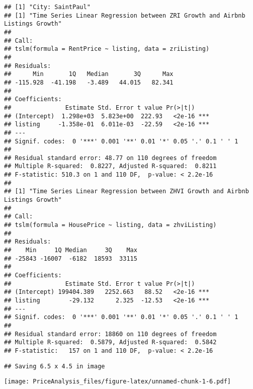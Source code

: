 \documentclass[
]{article}
\begin{document}
\begin{verbatim}
## [1] "City: SaintPaul"
## [1] "Time Series Linear Regression between ZRI Growth and Airbnb Listings Growth"
## 
## Call:
## tslm(formula = RentPrice ~ listing, data = zriListing)
## 
## Residuals:
##      Min       1Q   Median       3Q      Max 
## -115.928  -41.198   -3.489   44.015   82.341 
## 
## Coefficients:
##               Estimate Std. Error t value Pr(>|t|)    
## (Intercept)  1.298e+03  5.823e+00  222.93   <2e-16 ***
## listing     -1.358e-01  6.011e-03  -22.59   <2e-16 ***
## ---
## Signif. codes:  0 '***' 0.001 '**' 0.01 '*' 0.05 '.' 0.1 ' ' 1
## 
## Residual standard error: 48.77 on 110 degrees of freedom
## Multiple R-squared:  0.8227, Adjusted R-squared:  0.8211 
## F-statistic: 510.3 on 1 and 110 DF,  p-value: < 2.2e-16
## 
## [1] "Time Series Linear Regression between ZHVI Growth and Airbnb Listings Growth"
## 
## Call:
## tslm(formula = HousePrice ~ listing, data = zhviListing)
## 
## Residuals:
##    Min     1Q Median     3Q    Max 
## -25843 -16007  -6182  18593  33115 
## 
## Coefficients:
##               Estimate Std. Error t value Pr(>|t|)    
## (Intercept) 199404.389   2252.663   88.52   <2e-16 ***
## listing        -29.132      2.325  -12.53   <2e-16 ***
## ---
## Signif. codes:  0 '***' 0.001 '**' 0.01 '*' 0.05 '.' 0.1 ' ' 1
## 
## Residual standard error: 18860 on 110 degrees of freedom
## Multiple R-squared:  0.5879, Adjusted R-squared:  0.5842 
## F-statistic:   157 on 1 and 110 DF,  p-value: < 2.2e-16
\end{verbatim}

\begin{verbatim}
## Saving 6.5 x 4.5 in image
\end{verbatim}

\texttt{[image: PriceAnalysis\_files/figure-latex/unnamed-chunk-1-6.pdf]}
\end{document}
